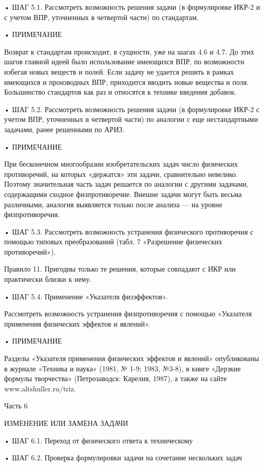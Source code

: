 •  ШАГ 5.1.  Рассмотреть  возможность решения  задачи (в  формулировке
ИКР-2 и с учетом ВПР, уточненных в четвертой части) по стандартам.

• ПРИМЕЧАНИЕ

Возврат к стандартам  происходит, в сущности, уже на шагах  4.6 и 4.7.
До  этих шагов  главной  идеей было  использование  имеющихся ВПР,  по
возможности  избегая новых  веществ и  полей. Если  задачу не  удается
решить в рамках имеющихся и  производных ВПР, приходится вводить новые
вещества и поля. Большинство стандартов  как раз и относятся к технике
введения добавок.

•  ШАГ 5.2.  Рассмотреть  возможность решения  задачи (в  формулировке
ИКР-2 с  учетом ВПР, уточненных в  четвертой части) по аналогии  с еще
нестандартными задачами, ранее решенными по АРИЗ.

• ПРИМЕЧАНИЕ

При бесконечном  многообразии изобретательских задач  число физических
противоречий, на которых «держатся» эти задачи, сравнительно невелико.
Поэтому  значительная  часть  задач  решается по  аналогии  с  другими
задачами,  содержащими сходное  физпротиворечие.  Внешне задачи  могут
быть весьма различными, аналогия выявляется  только после анализа — на
уровне физпротиворечия.


• ШАГ 5.3. Рассмотреть возможность устранения физического противоречия
с  помощью  типовых  преобразований (табл.  7  «Разрешение  физических
противоречий»).

Правило 11.  Пригодны только те  решения, которые совпадают с  ИКР или
практически близки к нему.

• ШАГ 5.4. Применение «Указателя физэффектов».

Рассмотреть   возможность   устранения   физпротиворечия   с   помощью
«Указателя применения физических эффектов и явлений».

• ПРИМЕЧАНИЕ

Разделы   «Указателя  применения   физических   эффектов  и   явлений»
опубликованы в журнале «Техника и наука»  (1981, № 1-9; 1983, №3-8), в
книге «Дерзкие  формулы творчества»  (Петрозаводск: Карелия,  1987), а
также на сайте www.altshuller.ru/triz.




Часть 6

ИЗМЕНЕНИЕ ИЛИ ЗАМЕНА ЗАДАЧИ

• ШАГ 6.1. Переход от физического ответа к техническому

• ШАГ 6.2. Проверка формулировки задачи на сочетание нескольких задач

